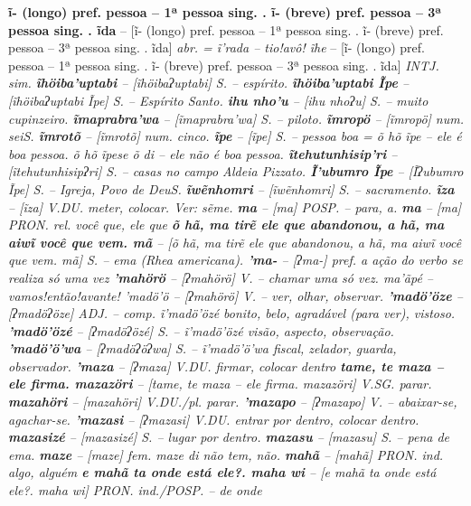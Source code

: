 \textbf{ĩ- (longo) pref. pessoa -- 1ª pessoa sing. . ĩ- (breve) pref. pessoa -- 3ª pessoa sing. . ĩda} -- [ĩ- (longo) pref. pessoa -- 1ª pessoa sing. . ĩ- (breve) pref. pessoa -- 3ª pessoa sing. . ĩda] \textit{abr. = ĩ'rada -- tio!avô! ĩhe} -- [ĩ- (longo) pref. pessoa -- 1ª pessoa sing. . ĩ- (breve) pref. pessoa -- 3ª pessoa sing. . ĩda] \textit{INTJ. sim.
\textbf{ĩhöiba'uptabi} -- [ĩhöibaʔuptabi] \textit{S.} -- espírito.
\textbf{ĩhöiba'uptabi Ĩpe} -- [ĩhöibaʔuptabi Ĩpe] \textit{S.} -- Espírito Santo.
\textbf{ihu nho'u} -- [ihu nhoʔu] \textit{S.} -- muito cupinzeiro.
\textbf{ĩmaprabra’wa} -- [ĩmaprabra’wa] \textit{S.} -- piloto.
\textbf{ĩmropö} -- [ĩmropö] \textit{num. seiS.}
\textbf{ĩmrotõ} -- [ĩmrotõ] \textit{num. cinco.
\textbf{ĩpe} -- [ĩpe] \textit{S.} -- pessoa boa = õ hõ ĩpe -- ele é boa pessoa. õ hõ ĩpese õ di -- ele não é boa pessoa.
\textbf{ĩtehutunhisip'ri} -- [ĩtehutunhisipʔri] \textit{S.} -- casas no campo Aldeia Pizzato.
\textbf{Ĩ'ubumro Ĩpe} -- [Ĩʔubumro Ĩpe] \textit{S.} -- Igreja, Povo de DeuS.}
\textbf{ĩwẽnhomri} -- [ĩwẽnhomri] \textit{S.} -- sacramento.
\textbf{ĩza} -- [ĩza] \textit{V.}DU. meter, colocar. Ver: sẽme.
\textbf{ma} -- [ma] \textit{POSP.} -- para, a.
\textbf{ma} -- [ma] \textit{PRON. rel. você que, ele que
\textbf{õ hã, ma tirẽ ele que abandonou, a hã, ma aiwĩ você que vem. mã} -- [õ hã, ma tirẽ ele que abandonou, a hã, ma aiwĩ você que vem. mã] \textit{S.} -- ema (Rhea americana).
\textbf{'ma-} -- [ʔma-] \textit{pref. a ação do verbo se realiza só uma vez
\textbf{'mahörö} -- [ʔmahörö] \textit{V.} -- chamar uma só vez. ma'ãpé -- vamos!então!avante! 'madö'ö} -- [ʔmahörö] \textit{V.} -- ver, olhar, observar.
\textbf{'madö'öze} -- [ʔmadöʔöze] \textit{ADJ.} -- comp. ĩ'madö'özé bonito, belo, agradável (para ver), vistoso.
\textbf{'madö'özé} -- [ʔmadöʔözé] \textit{S.} -- ĩ'madö'özé visão, aspecto, observação.
\textbf{'madö'ö'wa} -- [ʔmadöʔöʔwa] \textit{S.} -- ĩ'madö'ö'wa fiscal, zelador, guarda, observador.
\textbf{'maza} -- [ʔmaza] \textit{V.}DU. firmar, colocar dentro
\textbf{tame, te maza -- ele firma. mazazöri} -- [tame, te maza -- ele firma. mazazöri] \textit{V.}SG. parar.
\textbf{mazahöri} -- [mazahöri] \textit{V.}DU./pl. parar.
\textbf{'mazapo} -- [ʔmazapo] \textit{V.} -- abaixar-se, agachar-se.
\textbf{'mazasi} -- [ʔmazasi] \textit{V.}DU. entrar por dentro, colocar dentro.
\textbf{mazasizé} -- [mazasizé] \textit{S.} -- lugar por dentro.
\textbf{mazasu} -- [mazasu] \textit{S.} -- pena de ema.
\textbf{maze} -- [maze] \textit{fem. maze di não tem, não.
\textbf{mahã} -- [mahã] \textit{PRON. ind. algo, alguém
\textbf{e mahã ta onde está ele?. maha wi} -- [e mahã ta onde está ele?. maha wi] \textit{PRON. ind./POSP.} -- de onde
}}}}
